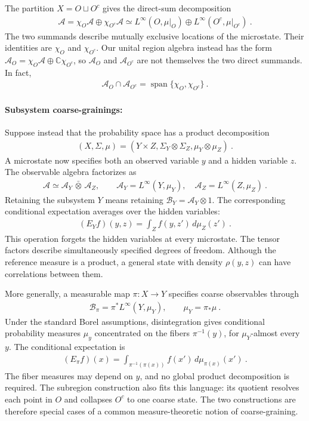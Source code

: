 \documentclass[a4paper,11pt]{article}
\theoremstyle{definition}
\newcommand{\mA}{\mathcal{A}}
\newcommand{\mB}{\mathcal{B}}
\begin{document}
The partition $X=O\sqcup O^c$ gives the direct-sum decomposition
\begin{align}
    \mA=\chi_O\mA\oplus\chi_{O^c}\mA
    \simeq L^\infty(O,\mu|_O)\oplus L^\infty(O^c,\mu|_{O^c})\ .
\end{align}
The two summands describe mutually exclusive locations of the microstate. Their identities are $\chi_O$ and $\chi_{O^c}$. Our unital region algebra instead has the form $\mA_O=\chi_O\mA\oplus\mathbb C\chi_{O^c}$, so $\mA_O$ and $\mA_{O^c}$ are not themselves the two direct summands. In fact,
\begin{align}
    \mA_O\cap\mA_{O^c}=\operatorname{span}\{\chi_O,\chi_{O^c}\}\ .
\end{align}

\paragraph{Subsystem coarse-grainings:}
Suppose instead that the probability space has a product decomposition
\begin{align}
    (X,\Sigma,\mu)=(Y\times Z,\Sigma_Y\otimes\Sigma_Z,\mu_Y\otimes\mu_Z)\ .
\end{align}
A microstate now specifies both an observed variable $y$ and a hidden variable $z$. The observable algebra factorizes as
\begin{align}
    \mA\simeq\mA_Y\,\bar\otimes\,\mA_Z,
    \qquad \mA_Y=L^\infty(Y,\mu_Y),\quad
    \mA_Z=L^\infty(Z,\mu_Z)\ .
\end{align}
Retaining the subsystem $Y$ means retaining $\mB_Y=\mA_Y\otimes 1$. The corresponding conditional expectation averages over the hidden variables:
\begin{align}
    (E_Y f)(y,z)=\int_Z f(y,z')\,d\mu_Z(z')\ .
\end{align}
This operation forgets the hidden variables at every microstate. The tensor factors describe simultaneously specified degrees of freedom. Although the reference measure is a product, a general state with density $\rho(y,z)$ can have correlations between them.

More generally, a measurable map $\pi:X\to Y$ specifies coarse observables through
\begin{align}
    \mB_\pi=\pi^*L^\infty(Y,\mu_Y),
    \qquad \mu_Y=\pi_*\mu\ .
\end{align}
Under the standard Borel assumptions, disintegration gives conditional probability measures $\mu_y$ concentrated on the fibers $\pi^{-1}(y)$, for $\mu_Y$-almost every $y$. The conditional expectation is
\begin{align}
    (E_\pi f)(x)=\int_{\pi^{-1}(\pi(x))}f(x')\,d\mu_{\pi(x)}(x')\ .
\end{align}
The fiber measures may depend on $y$, and no global product decomposition is required. The subregion construction also fits this language: its quotient resolves each point in $O$ and collapses $O^c$ to one coarse state. The two constructions are therefore special cases of a common measure-theoretic notion of coarse-graining.
\end{document}
